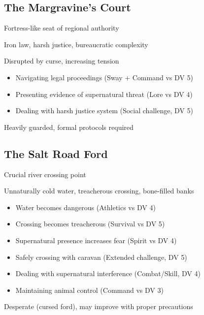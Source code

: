 \documentclass[11pt]{article}
\newenvironment{location}[1]{\begin{description}[leftmargin=*,style=standard]\item[\textbf{#1}]}{\end{description}}
\begin{document}
\subsection{The Margravine's Court}
\begin{location}{The Margravine's Court}
\item[Description:] Fortress-like seat of regional authority
\item[Features:] Iron law, harsh justice, bureaucratic complexity
\item[Political Climate:] Disrupted by curse, increasing tension
\item[Challenges:] 
  \begin{itemize}
    \item Navigating legal proceedings (Sway + Command vs DV 5)
    \item Presenting evidence of supernatural threat (Lore vs DV 4)
    \item Dealing with harsh justice system (Social challenge, DV 5)
  \end{itemize}
\item[Security:] Heavily guarded, formal protocols required
\end{location}

\subsection{The Salt Road Ford}
\begin{location}{The Salt Road Ford}
\item[Description:] Crucial river crossing point
\item[Features:] Unnaturally cold water, treacherous crossing, bone-filled banks
\item[Curse Effects:] 
  \begin{itemize}
    \item Water becomes dangerous (Athletics vs DV 4)
    \item Crossing becomes treacherous (Survival vs DV 5)
    \item Supernatural presence increases fear (Spirit vs DV 4)
  \end{itemize}
\item[Challenges:] 
  \begin{itemize}
    \item Safely crossing with caravan (Extended challenge, DV 5)
    \item Dealing with supernatural interference (Combat/Skill, DV 4)
    \item Maintaining animal control (Command vs DV 3)
  \end{itemize}
\item[Position:] Desperate (cursed ford), may improve with proper precautions
\end{location}
\end{document}

